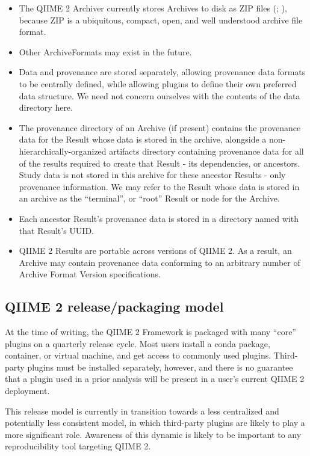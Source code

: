 \begin{itemize}
    \item The QIIME 2 Archiver currently stores Archives to disk as ZIP files (\cite{noauthor_appnote_nodate}; \cite{iso_isoiec_nodate}), because ZIP is a ubiquitous, compact, open, and well understood archive file format.
    \item Other ArchiveFormats may exist in the future.
    \item Data and provenance are stored separately, allowing provenance data formats to be centrally defined, while allowing plugins to define their own preferred data structure. We need not concern ourselves with the contents of the data directory here.
    \item The provenance directory of an Archive (if present) contains the provenance data for the Result whose data is stored in the archive, alongside a non-hierarchically-organized artifacts directory containing provenance data for all of the results required to create that Result - its dependencies, or ancestors. Study data is not stored in this archive for these ancestor Results - only provenance information. We may refer to the Result whose data is stored in an archive as the “terminal”, or “root” Result or node for the Archive.
    \item Each ancestor Result’s provenance data is stored in a directory named with that Result’s UUID.
    \item QIIME 2 Results are portable across versions of QIIME 2. As a result, an Archive may contain provenance data conforming to an arbitrary number of Archive Format Version specifications.
\end{itemize}

\subsection{QIIME 2 release/packaging model}
At the time of writing, the QIIME 2 Framework is packaged with many “core”
plugins on a quarterly release cycle. Most users install a conda package,
container, or virtual machine, and get access to commonly used plugins.
Third-party plugins must be installed separately, however, and there is no
guarantee that a plugin used in a prior analysis will be present in a user’s
current QIIME 2 deployment.

This release model is currently in transition towards a less centralized and
potentially less consistent model, in which third-party plugins are likely to
play a more significant role. Awareness of this dynamic is likely to be
important to any reproducibility tool targeting QIIME 2.


